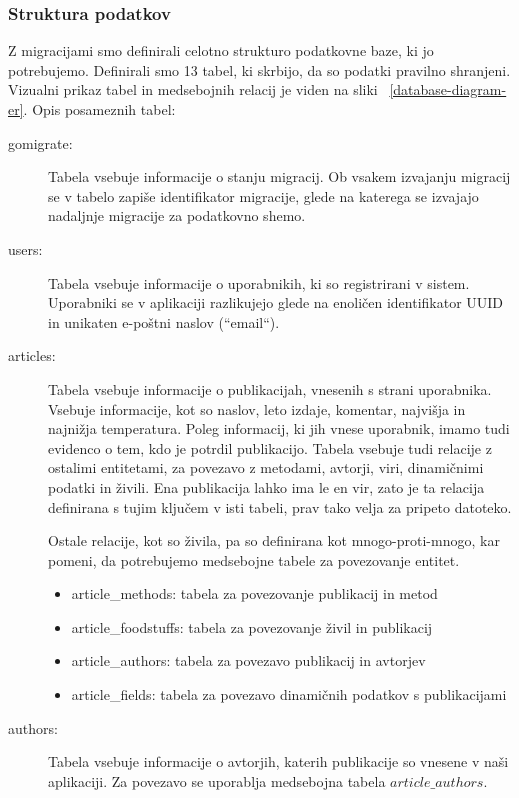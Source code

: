 \subsubsection{Struktura podatkov }
Z migracijami smo definirali celotno strukturo podatkovne baze, ki jo potrebujemo. Definirali smo 13 tabel, ki skrbijo, da so podatki pravilno shranjeni. Vizualni prikaz tabel in medsebojnih relacij je viden na sliki ~\ref{database-diagram-er}. Opis posameznih tabel:
\begin{description}
\item[gomigrate:] Tabela vsebuje informacije o stanju migracij. Ob vsakem izvajanju migracij se v tabelo zapiše identifikator migracije, glede na katerega se izvajajo nadaljnje migracije za podatkovno shemo.

\item[users:] Tabela vsebuje informacije o uporabnikih, ki so registrirani v sistem. Uporabniki se v aplikaciji razlikujejo glede na enoličen identifikator UUID in unikaten e-poštni naslov (``email``).

\item[articles:] Tabela vsebuje informacije o publikacijah, vnesenih s strani uporabnika. Vsebuje informacije, kot so naslov, leto izdaje, komentar, najvišja in najnižja temperatura. Poleg informacij, ki jih vnese uporabnik, imamo tudi evidenco o tem, kdo je potrdil publikacijo. Tabela vsebuje tudi relacije z ostalimi entitetami, za povezavo z metodami, avtorji, viri, dinamičnimi podatki in živili. Ena publikacija lahko ima le en vir, zato je ta relacija definirana s tujim ključem v isti tabeli, prav tako velja za pripeto datoteko.

Ostale relacije, kot so živila, pa so definirana kot mnogo-proti-mnogo, kar pomeni, da potrebujemo medsebojne tabele za povezovanje entitet.
\begin{itemize}
\item article\_methods: tabela za povezovanje publikacij in metod
\item article\_foodstuffs: tabela za povezovanje živil in publikacij
\item article\_authors: tabela za povezavo publikacij in avtorjev
\item article\_fields: tabela za povezavo dinamičnih podatkov s publikacijami
\end{itemize}

\item[authors:] Tabela vsebuje informacije o avtorjih, katerih publikacije so vnesene v naši aplikaciji. Za povezavo se uporablja medsebojna tabela $article\_authors$.


\end{description}
